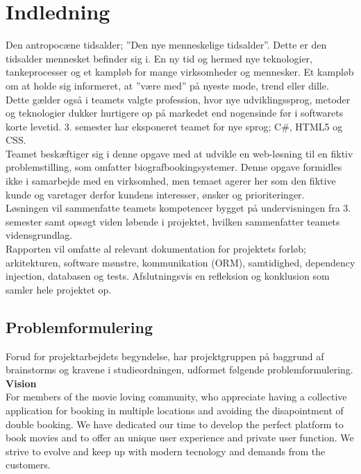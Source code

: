\chapter{Indledning}\label{ch:indledning}
Den antropocæne tidsalder; ”Den nye menneskelige tidsalder”. Dette er den tidsalder mennesket befinder sig i.
En ny tid og hermed nye teknologier, tankeprocesser og et kampløb for mange virksomheder og mennesker. 
Et kampløb om at holde sig informeret, at ”være med” på nyeste mode, trend eller dille. \\

Dette gælder også i teamets valgte profession, hvor nye udviklingssprog, metoder og teknologier dukker 
hurtigere op på markedet end nogensinde før i softwarets korte levetid. 3. semester har eksponeret teamet for nye sprog; 
C\#, HTML5 og CSS. \\

Teamet beskæftiger sig i denne opgave med at udvikle en web-løsning til en fiktiv problemstilling,
som omfatter biografbookingsystemer. Denne opgave formidles ikke i samarbejde med en virksomhed, 
men temaet agerer her som den fiktive kunde og varetager derfor kundens interesser, ønsker og prioriteringer. \\

Løsningen vil sammenfatte teamets kompetencer bygget på undervisningen fra 3. semester samt opsøgt viden løbende i 
projektet, hvilken sammenfatter teamets vidensgrundlag. \\

Rapporten vil omfatte al relevant dokumentation for projektets forløb; arkitekturen, software mønstre, 
kommunikation (ORM), samtidighed, dependency injection, databasen og tests. Afslutningsvis en refleksion og konklusion som samler hele projektet op.

\newpage
\section{Problemformulering}\label{sec:problemformulering}
Forud for projektarbejdets begyndelse, har projektgruppen på baggrund af brainstorms og kravene i
studieordningen, udformet følgende problemformulering. \\

\textbf{Vision} \\
For members of the movie loving community, who appreciate having a collective application for booking 
in multiple locations and avoiding the disapointment of double booking. We have dedicated our 
time to develop the perfect platform to book movies and to offer an unique user experience and private user function. 
We strive to evolve and keep up with modern tecnology and demands from the customers. \\

